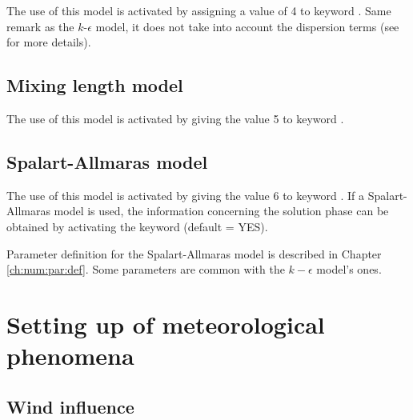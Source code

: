 The use of this model is activated by assigning a value of 4 to keyword
.
Same remark as the $k$-$\epsilon$ model, it does not take into account the
dispersion terms (see \cite{Smagorinsky1963} for more details).


\subsection{Mixing length model}

The use of this model is activated by giving the value 5 to keyword
.


\subsection{Spalart-Allmaras model}

The use of this model is activated by giving the value 6 to keyword
.
If a Spalart-Allmaras model is used, the information concerning
the solution phase can be obtained by activating the keyword
 (default = YES).

Parameter definition for the Spalart-Allmaras model is described in Chapter
\ref{ch:num:par:def}.
Some parameters are common with the $k-\epsilon$ model's ones.


\section{Setting up of meteorological phenomena}
\label{sec:param:met:phen}

\subsection{Wind influence}

